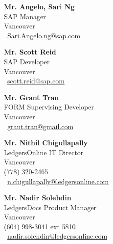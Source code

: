 \begin{paracol}{3}

    \textbf {Mr. Angelo, Sari Ng}\\
    SAP Manager\\
    Vancouver\\
    \Letter\ \href{mailto:sari.angelo.ng@sap.com}{Sari.Angelo.ng@sap.com}
        
    \textbf {Mr. Scott Reid}\\
    SAP Developer\\
    Vancouver\\
    \Letter\ \href{mailto:scott.reid@sap.com}{scott.reid@sap.com}
    
 \switchcolumn
 
    
    \textbf {Mr. Grant Tran}\\
    FORM Supervising Developer\\
    Vancouver\\
    \Letter\ \href{mailto:grant.tran@gmail.com}{grant.tran@gmail.com}
    
        \textbf {Mr. Nithil Chigullapally}\\
    LedgersOnline IT Director\\
    Vancouver\\
    (778) 320-2465\\
    \Letter\ \href{mailto:n.chigullapally@ledgersonline.com}{n.chigullapally@ledgersonline.com}
    
    

    

\switchcolumn

          \textbf {Mr. Nadir Solehdin}\\
    LedgersDocs Product Manager\\
    Vancouver\\
    (604) 998-3041 ext 5810 \\
    \Letter\ \href{mailto:nadir.solehdin@ledgersonline.com}{nadir.solehdin@ledgersonline.com}


\end{paracol}
